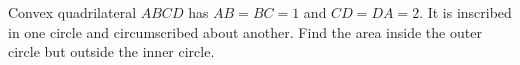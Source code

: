 Convex quadrilateral $ABCD$ has $AB=BC=1$ and $CD=DA=2$. It is inscribed in one circle and circumscribed about another. Find the area inside the outer circle but outside the inner circle.
